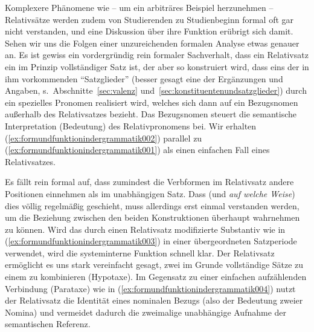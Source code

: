 Komplexere Phänomene wie -- um ein arbiträres Beispiel herzunehmen -- Relativsätze werden zudem von Studierenden zu Studienbeginn formal oft gar nicht verstanden, und eine Diskussion über ihre Funktion erübrigt sich damit.
Sehen wir uns die Folgen einer unzureichenden formalen Analyse etwas genauer an.
Es ist gewiss ein vordergründig rein formaler Sachverhalt, dass ein Relativsatz ein im Prinzip vollständiger Satz ist, der aber so konstruiert wird, dass eins der in ihm vorkommenden "`Satzglieder"' (besser gesagt eine der Ergänzungen und Angaben, s.\ Abschnitte~\ref{sec:valenz} und~\ref{sec:konstituentenundsatzglieder}) durch ein spezielles Pronomen realisiert wird, welches sich dann auf ein Bezugsnomen außerhalb des Relativsatzes bezieht.
Das Bezugsnomen steuert die semantische Interpretation (Bedeutung) des Relativpronomens bei.
Wir erhalten (\ref{ex:formundfunktionindergrammatik002}) parallel zu (\ref{ex:formundfunktionindergrammatik001}) als einen einfachen Fall eines Relativsatzes.

\begin{exe}
  \ex
  \begin{xlist}
  \end{xlist}
\end{exe}

Es fällt rein formal auf, dass zumindest die Verbformen im Relativsatz andere Positionen einnehmen als im unabhängigen Satz.
Dass (und \textit{auf welche Weise}) dies völlig regelmäßig geschieht, muss allerdings erst einmal verstanden werden, um die Beziehung zwischen den beiden Konstruktionen überhaupt wahrnehmen zu können.
Wird das durch einen Relativsatz modifizierte Substantiv wie in (\ref{ex:formundfunktionindergrammatik003}) in einer übergeordneten Satzperiode verwendet, wird die systeminterne Funktion schnell klar.
Der Relativsatz ermöglicht es uns stark vereinfacht gesagt, zwei im Grunde vollständige Sätze zu einem zu kombinieren (Hypotaxe).
Im Gegensatz zu einer einfachen aufzählenden Verbindung (Parataxe) wie in (\ref{ex:formundfunktionindergrammatik004}) nutzt der Relativsatz die Identität eines nominalen Bezugs (also der Bedeutung zweier Nomina) und vermeidet dadurch die zweimalige unabhängige Aufnahme der semantischen Referenz.

\begin{exe}
\ex
\begin{xlist}
\end{xlist}
\end{exe}

